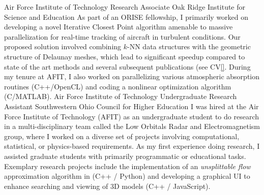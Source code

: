 \documentclass[11pt,a4paper,sans]{moderncv} %
\begin{document}
\vspace{0.75em}

			 {Air Force Institute of Technology}
			 {Research Associate}
			 {Oak Ridge Institute for Science and Education}
			 {}{ 
\vspace{3pt}
As part of an ORISE fellowship, I primarily worked on developing a novel Iterative Closest Point algorithm amenable to massive parallelization for real-time tracking of aircraft in turbulent conditions. Our proposed solution involved combining $k$-NN data structures with the geometric structure of Delaunay meshes, which lead to significant speedup compared to state of the art methods and several subsequent publications (see CV\ref{}.
During my tenure at AFIT, I also worked on parallelizing various atmospheric absorption routines (C++/OpenCL) and coding a nonlinear optimization algorithm (C/MATLAB).
}
\vspace{0.75em}
			 {Air Force Institute of Technology}
			 {Undergraduate Research Assistant}
			 {Southwestern Ohio Council for Higher Education}{}{\vspace{3pt}
I was hired at the Air Force Institute of Technology (AFIT) as an undergraduate student to do research in a multi-disciplinary team called the Low Orbitals Radar and Electromagnetism group, where I worked on a diverse set of projects involving computational, statistical, or physics-based requirements. As my first experience doing research, I assisted graduate students with primarily programmatic or educational tasks. Exemplary research projects include the implementation of an {\em unsplittable flow} approximation algorithm in (C++ / Python) and developing a graphical UI to enhance searching and viewing of 3D models (C++ / JavaScript). 
}
\end{document}
